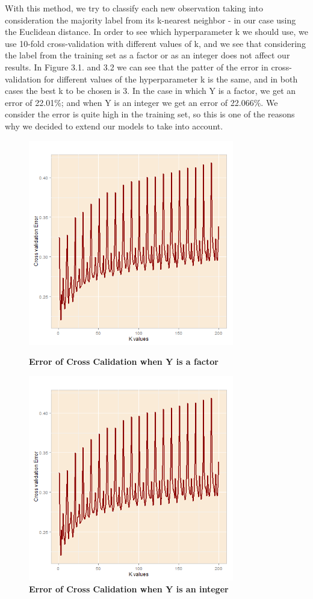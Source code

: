 \documentclass[paper=a4, fontsize=11pt]{scrartcl}
\numberwithin{equation}{section}
\numberwithin{figure}{section}
\numberwithin{table}{section}
\begin{document}
With this method, we try to classify each new observation taking into consideration the majority label from its k-nearest neighbor - in our case using the Euclidean distance. In order to see which hyperparameter k we should use, we use 10-fold cross-validation with different values of k, and we see that considering the label from the training set as a factor or as an integer does not affect our results. In Figure 3.1. and 3.2 we can see that the patter of the error in cross-validation for different values of the hyperparameter k is the same, and in both cases the best k to be chosen is 3. In the case in which Y is a factor, we get an error of 22.01\%; and when Y is an integer we get an error of 22.066\%. We consider the error is quite high in the training set, so this is one of the reasons why we decided to extend our models to take into account. 
\begin{figure}
    \centering
    \includegraphics[width=0.8\textwidth]{ECV_factor.png}
    \caption{\textbf{Error of Cross Calidation when Y is a factor}}
    \label{fig:ECV_factor}
    \centering
    \includegraphics[width=0.8\textwidth]{ECV_factor.png}
    \caption{\textbf{Error of Cross Calidation when Y is an integer}}
    \label{fig:ECV_notfactor}
\end{figure}
\end{document}
